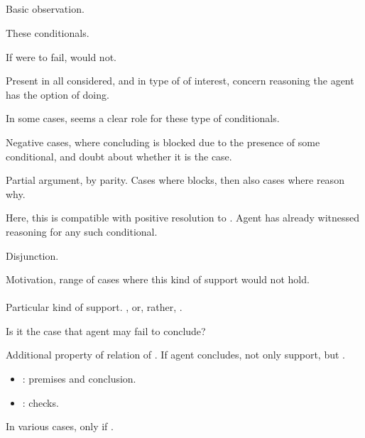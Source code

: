 \subsection{\zS{}}
\label{sec:zs}

\begin{note}
  Basic observation.

  These conditionals.

  If were to fail, would not.

  Present in all  considered, and in type of  of interest, concern reasoning the agent has the option of doing.

  In some cases, seems a clear role for these type of conditionals.
\end{note}

\begin{note}
  Negative cases, where concluding is blocked due to the presence of some conditional, and doubt about whether it is the case.
\end{note}

\begin{note}
  Partial argument, by parity.
  Cases where blocks, then also cases where reason why.
\end{note}

\begin{note}
  Here, this is compatible with positive resolution to \issueConstraint{}.
  Agent has already witnessed reasoning for any such conditional.
\end{note}

\begin{note}
  Disjunction.
\end{note}

\begin{note}
  Motivation, range of cases where this kind of support would not hold.
\end{note}

\hozline{}

\paragraph{}

\begin{note}[`\zSN{0}']
  Particular kind of support.
  , or, rather, \zS{}.

  Is it the case that agent may fail to conclude?

  Additional property of relation of \bS{}.
  If agent concludes, not only support, but \zS{}.
  \begin{itemize}
  \item
    : premises and conclusion.
  \item
    \zS{}: checks.
  \end{itemize}

  In various cases, \bS{} only if \zS{}.
\end{note}

